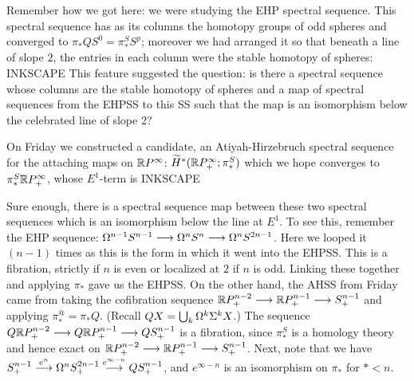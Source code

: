 Remember how we got here: we were studying the EHP spectral sequence.  This spectral sequence has as its columns the homotopy groups of odd spheres and converged to $\pi_* QS^0 = \pi_*^S S^p$; moreover we had arranged it so that beneath a line of slope $2$, the entries in each column were the stable homotopy of spheres: INKSCAPE  This feature suggested the question: is there a spectral sequence whose columns are the stable homotopy of spheres and a map of spectral sequences from the EHPSS to this SS such that the map is an isomorphism below the celebrated line of slope 2?

On Friday we constructed a candidate, an Atiyah-Hirzebruch spectral sequence for the attaching maps on $\mathbb{R} P^\infty$: $\widetilde H^*(\mathbb{R} P^\infty_+; \pi_*^S)$ which we hope converges to $\pi_*^S \mathbb{R} P^\infty_+$, whose $E^1$-term is INKSCAPE

Sure enough, there is a spectral sequence map between these two spectral sequences which is an isomorphism below the line at $E^1$.  To see this, remember the EHP sequence: $\Omega^{n-1} S^{n-1} \longrightarrow \Omega^n S^n \longrightarrow \Omega^n S^{2n-1}$.  Here we looped it $(n-1)$ times as this is the form in which it went into the EHPSS.  This is a fibration, strictly if $n$ is even or localized at $2$ if $n$ is odd.  Linking these together and applying $\pi_*$ gave us the EHPSS.  On the other hand, the AHSS from Friday came from taking the cofibration sequence $\mathbb{R} P^{n-2}_+ \longrightarrow \mathbb{R} P^{n-1}_+ \longrightarrow S^{n-1}_+$ and applying $\pi_*^@ = \pi_* Q$.  (Recall $QX = \bigcup_k \Omega^k \Sigma^k X$.)  The sequence $Q\mathbb{R} P^{n-2}_+ \longrightarrow Q\mathbb{R} P^{n-1}_+ \longrightarrow QS^{n-1}_+$ is a fibration, since $\pi_*^S$ is a homology theory and hence exact on $\mathbb{R} P^{n-2}_+ \longrightarrow \mathbb{R} P^{n-1}_+ \longrightarrow S^{n-1}_+$.  Next, note that we have $S^{n-1}_+ \stackrel{e^n}{\longrightarrow} \Omega^n S^{2n-1}_+ \stackrel{e^{\infty-n}}{\longrightarrow} QS^{n-1}_+$, and $e^{\infty-n}$ is an isomorphism on $\pi_*$ for $* < n$.

